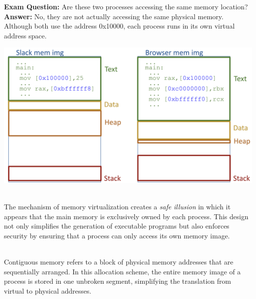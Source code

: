 \noindent
\begin{minipage}{0.45\textwidth}
\textbf{Exam Question:} Are these two processes accessing the same memory location? \\[3px]
\textbf{Answer:} No, they are not actually accessing the same physical memory. Although both use the address 0x10000, each process runs in its own virtual address space. 
\end{minipage}%
\hfill
\vline
\hfill
\begin{minipage}{0.45\textwidth}
\begin{center}
    \includegraphics[width=1.25\textwidth]{chapters/L4/images/virtual.png}
\end{center}
\end{minipage}\\[14px]

The mechanism of memory virtualization creates a \emph{safe illusion} in which it appears that the main memory is exclusively owned by each process. This design not only simplifies the generation of executable programs but also enforces security by ensuring that a process can only access its own memory image.

\begin{definition}
\leavevmode\\[2px]
Contiguous memory refers to a block of physical memory addresses that are sequentially arranged. In this allocation scheme, the entire memory image of a process is stored in one unbroken segment, simplifying the translation from virtual to physical addresses.
\end{definition}

